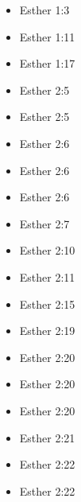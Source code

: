 \documentclass[14pt]{article}
\begin{document}
\begin{multicols}{2}\begin{itemize}
					
					\item Esther 1:3
					
					\item Esther 1:11
					
					\item Esther 1:17
					
					\item Esther 2:5
							
							\item Esther 2:5
							
							\item Esther 2:6
							
							\item Esther 2:6
							
							\item Esther 2:6
							
							\item Esther 2:7
							
							\item Esther 2:10
							
							\item Esther 2:11
							
							\item Esther 2:15
							
							\item Esther 2:19
							
							\item Esther 2:20
							
							\item Esther 2:20
							
							\item Esther 2:20
							
							\item Esther 2:21
							
							\item Esther 2:22
							
							\item Esther 2:22
							

\end{itemize}
\end{multicols}
\end{document}
